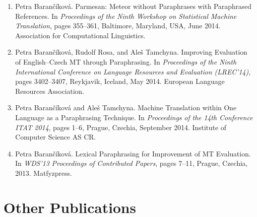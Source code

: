 \documentclass[12pt,a4paper]{report}
\begin{document}
\begin{enumerate}
    \item Petra Barančíková. Parmesan: Meteor without Paraphrases with Paraphrased References. In \textit{Proceedings of the Ninth Workshop on Statistical Machine Translation}, pages 355--361, Baltimore, Maryland, USA, June 2014. Association for Computational Linguistics. 

    \item Petra Barančíková, Rudolf Rosa, and Aleš Tamchyna. Improving Evaluation of English–Czech MT through Paraphrasing. In \textit{Proceedings of the Ninth International Conference on Language Resources and Evaluation (LREC'14)}, pages 3402--3407, Reykjavik, Iceland, May 2014. European Language Resources Association.

    \item Petra Barančíková and Aleš Tamchyna. Machine Translation within One Language as a Paraphrasing Technique. In \textit{Proceedings of the 14th Conference ITAT 2014}, pages 1--6, Prague, Czechia, September 2014. Institute of Computer Science AS CR.

    \item Petra Barančíková. Lexical Paraphrasing for Improvement of MT Evaluation. In \textit{WDS'13 Proceedings of Contributed Papers}, pages 7--11, Prague, Czechia, 2013. Matfyzpress.
\end{enumerate}

\section*{Other Publications}
\end{document}
